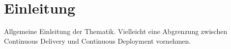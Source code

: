 \section{Einleitung}

Allgemeine Einleitung der Thematik. Vielleicht eine Abgrenzung zwischen
Continuous Delivery und Continuous Deployment vornehmen.